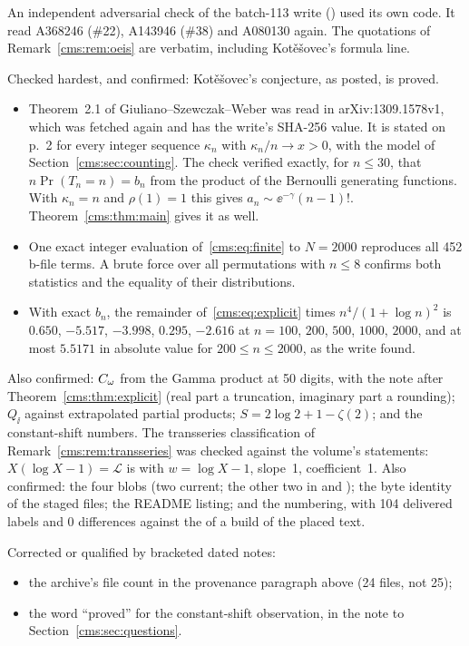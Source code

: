 \endgroup
\begin{writenote}\raggedright
An independent adversarial check of the batch-113 write () used its own code. It read
A368246 (\#22), A143946 (\#38) and A080130 again. The quotations of Remark~\ref{cms:rem:oeis} are verbatim,
including Kot\v{e}\v{s}ovec's formula line.

Checked hardest, and confirmed: Kot\v{e}\v{s}ovec's conjecture, as posted, is proved.
\begin{itemize}\raggedright
\item Theorem~2.1 of Giuliano--Szewczak--Weber was read in arXiv:1309.1578v1, which was fetched again and has
the write's SHA-256 value. It is stated on p.~2 for every integer sequence $\kappa_n$ with $\kappa_n/n\to x>0$,
with the model of Section~\ref{cms:sec:counting}. The check verified exactly, for $n\le30$, that
$n\Pr(T_n=n)=b_n$ from the product of the Bernoulli generating functions. With $\kappa_n=n$ and $\rho(1)=1$
this gives $a_n\sim\ee^{-\gamma}(n-1)!$. Theorem~\ref{cms:thm:main} gives it as well.
\item One exact integer evaluation of~\eqref{cms:eq:finite} to $N=2000$ reproduces all 452 b-file terms.
A brute force over all permutations with $n\le8$ confirms both statistics and the equality of their
distributions.
\item With exact $b_n$, the remainder of~\eqref{cms:eq:explicit} times $n^4/(1+\log n)^2$ is $0.650$,
$-5.517$, $-3.998$, $0.295$, $-2.616$ at $n=100$, $200$, $500$, $1000$, $2000$, and at most $5.5171$ in
absolute value for $200\le n\le2000$, as the write found.
\end{itemize}
Also confirmed: $C_\omega$ from the Gamma product at 50 digits, with the note after
Theorem~\ref{cms:thm:explicit} (real part a truncation, imaginary part a rounding); $Q_{\ii}$ against
extrapolated partial products; $S=2\log2+1-\zeta(2)$; and the constant-shift numbers. The transseries
classification of Remark~\ref{cms:rem:transseries} was checked against the volume's statements:
$X(\log X-1)=\mathcal L$ is  with $w=\log X-1$, slope~1, coefficient~1. Also
confirmed: the four  blobs (two current; the other two in  and
); the byte identity of the staged files; the README listing; and the numbering, with 104
delivered labels and 0 differences against the  of a build of the placed text.

Corrected or qualified by bracketed dated notes:
\begin{itemize}\raggedright
\item the archive's file count in the provenance paragraph above (24 files, not 25);
\item the word ``proved'' for the constant-shift observation, in the note to Section~\ref{cms:sec:questions}.
\end{itemize}
\end{writenote}
